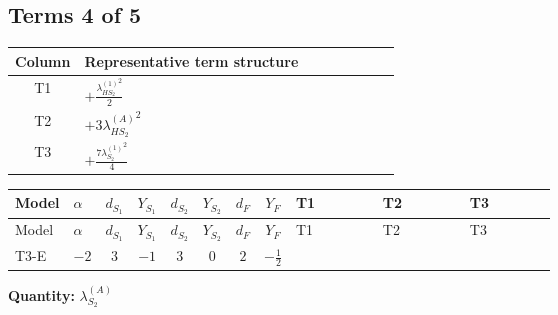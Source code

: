 \documentclass[8pt]{article}
\begin{document}
\begin{landscape}
\subsection*{Terms 4 of 5}
\begin{center}
\begin{tabular}{@{}c >{\raggedright\arraybackslash}p{0.82\linewidth}@{}}
\toprule
Column & Representative term structure \\
\midrule
T1 & \(\displaystyle +\frac{{\lambda_{HS_2}^{(1)}}^2}{2}\) \\
\midrule
T2 & \(\displaystyle +3 {\lambda_{HS_2}^{(A)}}^2\) \\
\midrule
T3 & \(\displaystyle +\frac{7 {\lambda_{S_2}^{(1)}}^2}{4}\) \\
\midrule
\bottomrule
\end{tabular}
\end{center}
\smallskip
\tiny
\begin{longtable}{@{}llcccccc >{\raggedright\arraybackslash}p{0.21\linewidth} >{\raggedright\arraybackslash}p{0.21\linewidth} >{\raggedright\arraybackslash}p{0.21\linewidth}@{}}
\toprule
Model & $\alpha$ & $d_{S_1}$ & $Y_{S_1}$ & $d_{S_2}$ & $Y_{S_2}$ & $d_F$ & $Y_F$ & T1 & T2 & T3 \\
\midrule
\endfirsthead
\toprule
Model & $\alpha$ & $d_{S_1}$ & $Y_{S_1}$ & $d_{S_2}$ & $Y_{S_2}$ & $d_F$ & $Y_F$ & T1 & T2 & T3 \\
\midrule
\endhead
T3-E & $-2$ & $3$ & $-1$ & $3$ & $0$ & $2$ & $-\frac{1}{2}$ & \scriptsize\adjustbox{max width=\linewidth}{$\begin{gathered} +\frac{{\lambda_{HS_2}^{(1)}}^2}{2}\end{gathered}$} & \scriptsize\adjustbox{max width=\linewidth}{$\begin{gathered} +3 {\lambda_{HS_2}^{(A)}}^2\end{gathered}$} & \scriptsize\adjustbox{max width=\linewidth}{$\begin{gathered} +\frac{7 {\lambda_{S_2}^{(1)}}^2}{4}\end{gathered}$} \\
\midrule
\bottomrule
\end{longtable}
\clearpage
\noindent\textbf{Quantity: }$\lambda_{S_2}^{(A)}$\par\smallskip

\end{landscape}
\end{document}
